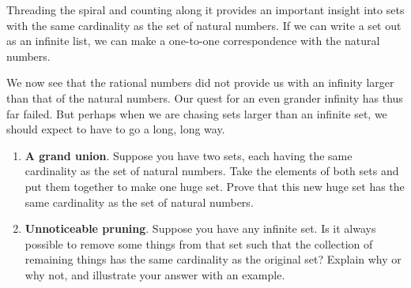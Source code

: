 Threading the spiral and counting along it provides an important insight into sets with the same cardinality as the set of natural numbers. If we can write a set out as an infinite list, we can make a one-to-one correspondence with the natural numbers.

We now see that the rational numbers did not provide us with an infinity larger than that of the natural numbers. Our quest for an even grander infinity has thus far failed. But perhaps when we are chasing sets larger than an infinite set, we should expect to have to go a long, long way.

\begin{enumerate}
	\item \textbf{A grand union}. Suppose you have two sets, each having the same
cardinality as the set of natural numbers. Take the elements of both
sets and put them together to make one huge set. Prove that this
new huge set has the same cardinality as the set of natural numbers. \vfill
\item \textbf{ Unnoticeable pruning}. Suppose you have any infinite set. Is it
always possible to remove some things from that set such that the
collection of remaining things has the same cardinality as the original
set? Explain why or why not, and illustrate your answer with an
example.\vfill
\end{enumerate}

\clearpage